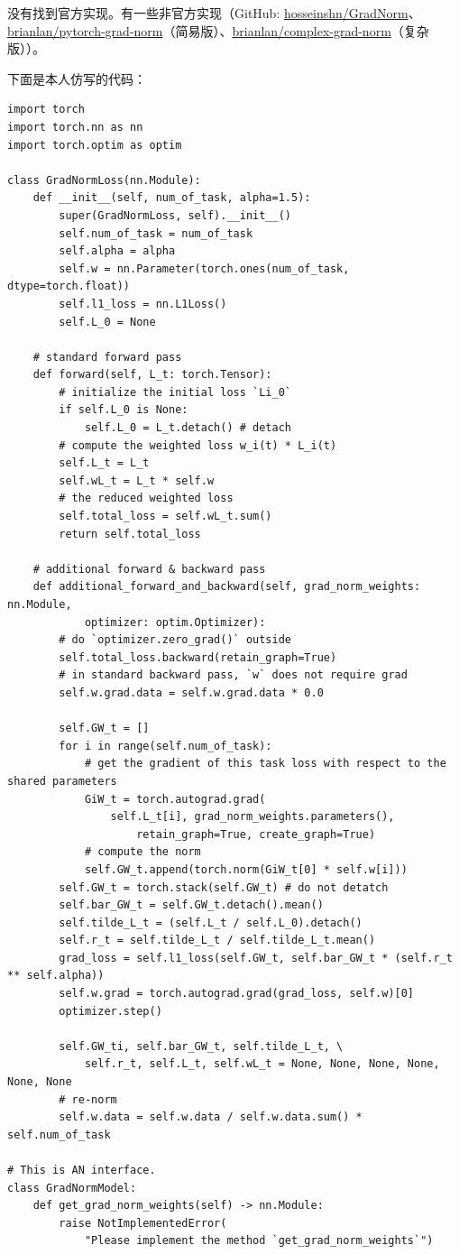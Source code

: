\documentclass{ctexart}
\begin{document}
没有找到官方实现。有一些非官方实现（GitHub: \href{https://github.com/hosseinshn/GradNorm}{hosseinshn/GradNorm}、\href{https://github.com/brianlan/pytorch-grad-norm}{brianlan/pytorch-grad-norm}（简易版）、\href{https://github.com/brianlan/complex-grad-norm}{brianlan/complex-grad-norm}（复杂版））。

下面是本人仿写的代码：
\begin{verbatim}
import torch
import torch.nn as nn
import torch.optim as optim

class GradNormLoss(nn.Module):
    def __init__(self, num_of_task, alpha=1.5):
        super(GradNormLoss, self).__init__()
        self.num_of_task = num_of_task
        self.alpha = alpha
        self.w = nn.Parameter(torch.ones(num_of_task, dtype=torch.float))
        self.l1_loss = nn.L1Loss()
        self.L_0 = None

    # standard forward pass
    def forward(self, L_t: torch.Tensor):
        # initialize the initial loss `Li_0`
        if self.L_0 is None:
            self.L_0 = L_t.detach() # detach
        # compute the weighted loss w_i(t) * L_i(t)
        self.L_t = L_t
        self.wL_t = L_t * self.w
        # the reduced weighted loss
        self.total_loss = self.wL_t.sum()
        return self.total_loss

    # additional forward & backward pass
    def additional_forward_and_backward(self, grad_norm_weights: nn.Module, 
            optimizer: optim.Optimizer):
        # do `optimizer.zero_grad()` outside
        self.total_loss.backward(retain_graph=True)
        # in standard backward pass, `w` does not require grad
        self.w.grad.data = self.w.grad.data * 0.0

        self.GW_t = []
        for i in range(self.num_of_task):
            # get the gradient of this task loss with respect to the shared parameters
            GiW_t = torch.autograd.grad(
                self.L_t[i], grad_norm_weights.parameters(),
                    retain_graph=True, create_graph=True)
            # compute the norm
            self.GW_t.append(torch.norm(GiW_t[0] * self.w[i]))
        self.GW_t = torch.stack(self.GW_t) # do not detatch
        self.bar_GW_t = self.GW_t.detach().mean()
        self.tilde_L_t = (self.L_t / self.L_0).detach()
        self.r_t = self.tilde_L_t / self.tilde_L_t.mean()
        grad_loss = self.l1_loss(self.GW_t, self.bar_GW_t * (self.r_t ** self.alpha))
        self.w.grad = torch.autograd.grad(grad_loss, self.w)[0]
        optimizer.step()

        self.GW_ti, self.bar_GW_t, self.tilde_L_t, \
            self.r_t, self.L_t, self.wL_t = None, None, None, None, None, None
        # re-norm
        self.w.data = self.w.data / self.w.data.sum() * self.num_of_task

# This is AN interface.
class GradNormModel:
    def get_grad_norm_weights(self) -> nn.Module:
        raise NotImplementedError(
            "Please implement the method `get_grad_norm_weights`")
\end{verbatim}
\end{document}
